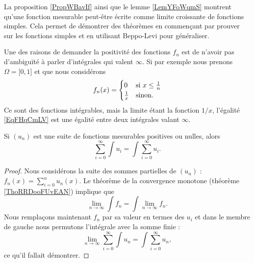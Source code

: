 \begin{remark}
    La proposition \ref{PropWBavIf} ainsi que le lemme \ref{LemYFoWqmS} montrent qu'une fonction mesurable peut-être écrite comme limite croissante de fonctions simples. Cela permet de démontrer des théorèmes en commençant par prouver sur les fonctions simples et en utilisant Beppo-Levi pour généraliser.
\end{remark}

\begin{remark}
    Une des raisons de demander la positivité des fonctions \( f_n\) est de n'avoir pas d'ambiguïté à parler d'intégrales qui valent \( \infty\). Si par exemple nous prenons \( \Omega=\mathopen[ 0 , 1 \mathclose]\) et que nous considérons
    \begin{equation}
        f_n(x)=\begin{cases}
            0    &   \text{si \( x\leq \frac{1}{ n }\)}\\
            \frac{1}{ x }    &    \text{sinon}.
        \end{cases}
    \end{equation}
    Ce sont des fonctions intégrables, mais la limite étant la fonction \( 1/x\), l'égalité \eqref{EqFHqCmLV} est une égalité entre deux intégrales valant \( \infty\).
\end{remark}

\begin{corollary} \label{CorNKXwhdz}
    Si \( (u_n)\) est une suite de fonctions mesurables positives ou nulles, alors
    \begin{equation}
        \sum_{i=0}^{\infty}\int u_i=\int\sum_{i=0}^{\infty}u_i.
    \end{equation}
\end{corollary}

\begin{proof}
    Nous considérons la suite des sommes partielles de \( (u_n)\) : \( f_n(x)=\sum_{i=0}^nu_n(x)\). Le théorème de la convergence monotone (théorème \ref{ThoRRDooFUvEAN}) implique que
    \begin{equation}
        \lim_{n\to \infty} \int f_n=\int\lim_{n\to \infty} f_n.
    \end{equation}
    Nous remplaçons maintenant \( f_n\) par sa valeur en termes des \( u_i\) et dans le membre de gauche nous permutons l'intégrale avec la somme finie :
    \begin{equation}
        \lim_{n\to \infty} \sum_{i=0}^{\infty}\int u_n=\int\sum_{i=0}^{\infty}u_n,
    \end{equation}
    ce qu'il fallait démontrer.
\end{proof}

